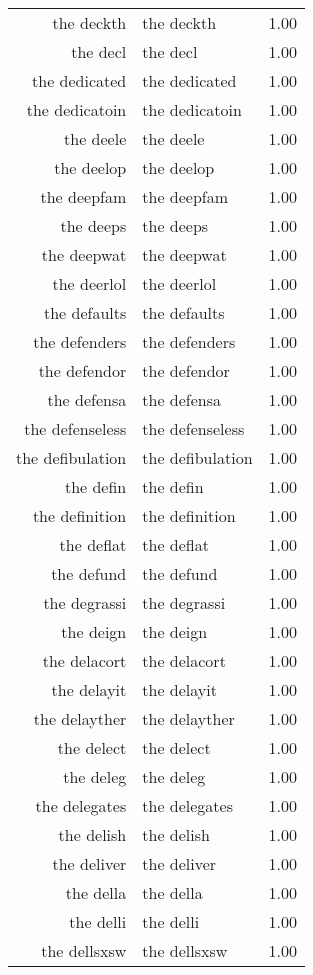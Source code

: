 \begin{table}[ht]
\begin{tabular}{rlr}
  the deckth & the deckth & 1.00 \\ 
  the decl & the decl & 1.00 \\ 
  the dedicated & the dedicated & 1.00 \\ 
  the dedicatoin & the dedicatoin & 1.00 \\ 
  the deele & the deele & 1.00 \\ 
  the deelop & the deelop & 1.00 \\ 
  the deepfam & the deepfam & 1.00 \\ 
  the deeps & the deeps & 1.00 \\ 
  the deepwat & the deepwat & 1.00 \\ 
  the deerlol & the deerlol & 1.00 \\ 
  the defaults & the defaults & 1.00 \\ 
  the defenders & the defenders & 1.00 \\ 
  the defendor & the defendor & 1.00 \\ 
  the defensa & the defensa & 1.00 \\ 
  the defenseless & the defenseless & 1.00 \\ 
  the defibulation & the defibulation & 1.00 \\ 
  the defin & the defin & 1.00 \\ 
  the definition & the definition & 1.00 \\ 
  the deflat & the deflat & 1.00 \\ 
  the defund & the defund & 1.00 \\ 
  the degrassi & the degrassi & 1.00 \\ 
  the deign & the deign & 1.00 \\ 
  the delacort & the delacort & 1.00 \\ 
  the delayit & the delayit & 1.00 \\ 
  the delayther & the delayther & 1.00 \\ 
  the delect & the delect & 1.00 \\ 
  the deleg & the deleg & 1.00 \\ 
  the delegates & the delegates & 1.00 \\ 
  the delish & the delish & 1.00 \\ 
  the deliver & the deliver & 1.00 \\ 
  the della & the della & 1.00 \\ 
  the delli & the delli & 1.00 \\ 
  the dellsxsw & the dellsxsw & 1.00 \\ 

\end{tabular}
\end{table}
